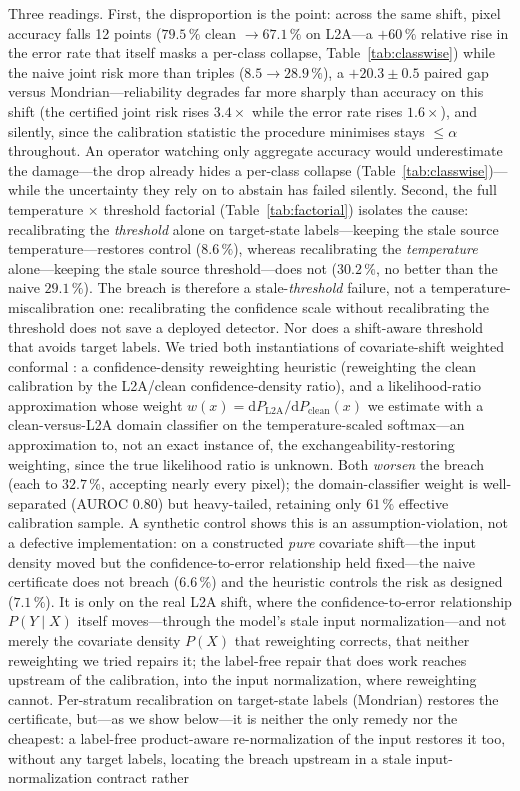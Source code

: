 \documentclass[preprint,3p,times]{elsarticle}
\begin{document}
Three readings. First, the disproportion is the point: across the same shift, pixel accuracy falls 12 points ($79.5\,\%$ clean $\to 67.1\,\%$ on L2A---a $+60\,\%$ relative rise in the error rate that itself masks a per-class collapse, Table~\ref{tab:classwise}) while the naive joint risk more than triples ($8.5 \to 28.9\,\%$), a $+20.3 \pm 0.5$ paired gap versus Mondrian---reliability degrades far more sharply than accuracy on this shift (the certified joint risk rises $3.4\times$ while the error rate rises $1.6\times$), and silently, since the calibration statistic the procedure minimises stays $\leq \alpha$ throughout. An operator watching only aggregate accuracy would underestimate the damage---the drop already hides a per-class collapse (Table~\ref{tab:classwise})---while the uncertainty they rely on to abstain has failed silently. Second, the full temperature $\times$ threshold factorial (Table~\ref{tab:factorial}) isolates the cause: recalibrating the \emph{threshold} alone on target-state labels---keeping the stale source temperature---restores control ($8.6\,\%$), whereas recalibrating the \emph{temperature} alone---keeping the stale source threshold---does not ($30.2\,\%$, no better than the naive $29.1\,\%$). The breach is therefore a stale-\emph{threshold} failure, not a temperature-miscalibration one: recalibrating the confidence scale without recalibrating the threshold does not save a deployed detector. Nor does a shift-aware threshold that avoids target labels. We tried both instantiations of covariate-shift weighted conformal \citep{tibshirani2019}: a confidence-density reweighting heuristic (reweighting the clean calibration by the L2A/clean confidence-density ratio), and a likelihood-ratio approximation whose weight $w(x)=\mathrm{d}P_{\mathrm{L2A}}/\mathrm{d}P_{\mathrm{clean}}(x)$ we estimate with a clean-versus-L2A domain classifier on the temperature-scaled softmax---an approximation to, not an exact instance of, the exchangeability-restoring weighting, since the true likelihood ratio is unknown. Both \emph{worsen} the breach (each to $32.7\,\%$, accepting nearly every pixel); the domain-classifier weight is well-separated (AUROC $0.80$) but heavy-tailed, retaining only $61\,\%$ effective calibration sample. A synthetic control shows this is an assumption-violation, not a defective implementation: on a constructed \emph{pure} covariate shift---the input density moved but the confidence-to-error relationship held fixed---the naive certificate does not breach ($6.6\,\%$) and the heuristic controls the risk as designed ($7.1\,\%$). It is only on the real L2A shift, where the confidence-to-error relationship $P(Y\!\mid\!X)$ itself moves---through the model's stale input normalization---and not merely the covariate density $P(X)$ that reweighting corrects, that neither reweighting we tried repairs it; the label-free repair that does work reaches upstream of the calibration, into the input normalization, where reweighting cannot. Per-stratum recalibration on target-state labels (Mondrian) restores the certificate, but---as we show below---it is neither the only remedy nor the cheapest: a label-free product-aware re-normalization of the input restores it too, without any target labels, locating the breach upstream in a stale input-normalization contract rather 
\end{document}
